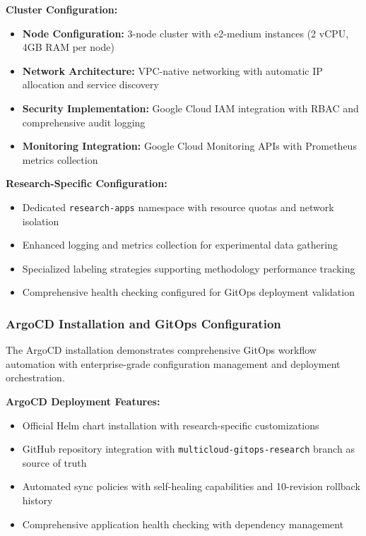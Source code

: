 \textbf{Cluster Configuration:}
\begin{itemize}
\item \textbf{Node Configuration:} 3-node cluster with e2-medium instances (2 vCPU, 4GB RAM per node)
\item \textbf{Network Architecture:} VPC-native networking with automatic IP allocation and service discovery
\item \textbf{Security Implementation:} Google Cloud IAM integration with RBAC and comprehensive audit logging
\item \textbf{Monitoring Integration:} Google Cloud Monitoring APIs with Prometheus metrics collection
\end{itemize}

\textbf{Research-Specific Configuration:}
\begin{itemize}
\item Dedicated \texttt{research-apps} namespace with resource quotas and network isolation
\item Enhanced logging and metrics collection for experimental data gathering
\item Specialized labeling strategies supporting methodology performance tracking
\item Comprehensive health checking configured for GitOps deployment validation
\end{itemize}

\subsubsection{ArgoCD Installation and GitOps Configuration}

The ArgoCD installation demonstrates comprehensive GitOps workflow automation with enterprise-grade configuration management and deployment orchestration.

\textbf{ArgoCD Deployment Features:}
\begin{itemize}
\item Official Helm chart installation with research-specific customizations
\item GitHub repository integration with \texttt{multicloud-gitops-research} branch as source of truth
\item Automated sync policies with self-healing capabilities and 10-revision rollback history
\item Comprehensive application health checking with dependency management
\end{itemize}

